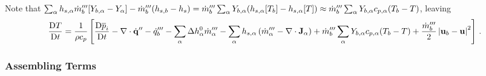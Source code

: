 Note that $\sum_\alpha h_{s,\alpha} \dot{m}_{b}^{{\prime\prime\prime}}[Y_{b,\alpha} - Y_\alpha] - \dot{m}_{b}^{{\prime\prime\prime}} ( h_{s,b} - h_s ) = \dot{m}_{b}^{{\prime\prime\prime}} \sum_\alpha Y_{b,\alpha} (h_{s,\alpha}[T_b] - h_{s,\alpha}[T]) \approx \dot{m}_{b}^{{\prime\prime\prime}} \sum_\alpha Y_{b,\alpha} c_{p,\alpha}(T_b-T)$, leaving
\begin{equation}
\label{eqn_DTDt}
\frac{\mbox{D} T}{\mbox{D} t} = \frac{1}{\rho c_p} \left[\frac{\mbox{D} \overline{p}_i }{\mbox{D} t}
- \Div\dot{\mathbf{q}}^{\prime\prime} - \dq_b''' - \sum_\alpha \Delta h^0_\alpha \dot{m}_\alpha^{\tripleprime} - \sum_\alpha h_{s,\alpha}\left(  \dot{m}_\alpha^{\tripleprime} - \Div \mathbf{J}_{\alpha} \right) + \dot{m}_{b}^{\tripleprime} \sum_\alpha Y_{b,\alpha} c_{p,\alpha}(T_b-T) + \frac{\dot{m}_{b}^{\tripleprime}}{2}\left|\mathbf{u}_b-\mathbf{u}\right|^2 \right] \,\mbox{.} \nonumber \vspace{0.3cm} \\
\end{equation}

\subsubsection{Assembling Terms}
\label{putting_it_all_together}


